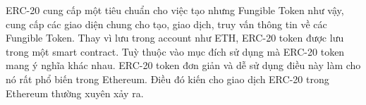 \documentclass[../thesis.tex]{subfiles}
\begin{document}
ERC-20 cung cấp một tiêu chuẩn cho việc tạo nhưng Fungible Token như vậy, cung cấp các giao diện chung cho tạo, giao dịch, truy vấn thông tin về các Fungible Token. Thay vì lưu trong account như ETH, ERC-20 token được lưu trong một smart contract. Tuỳ thuộc vào mục đích sử dụng mà ERC-20 token mang ý nghĩa khác nhau. ERC-20 token đơn giản và dễ sử dụng điều này làm cho nó rất phổ biến trong Ethereum. Điều đó kiến cho giao dịch ERC-20 trong Ethereum thường xuyên xảy ra.
\end{document}
